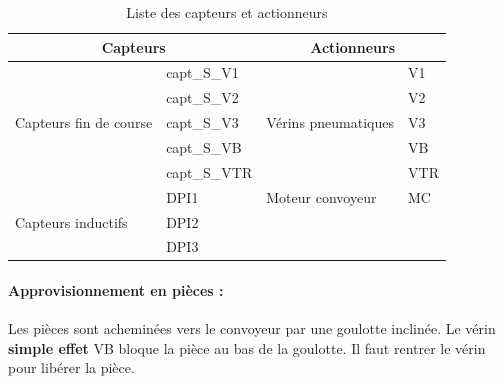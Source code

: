 \documentclass[11pt, multicol]{article}
\begin{document}
\begin{table}[ht]
\centering
	\begin{tabular}{|ll || ll|}
	\hline
		\multicolumn{2}{|c||}{Capteurs}       				& \multicolumn{2}{c|}{Actionneurs}                  \\\hline
		\multirow{5}{*}{Capteurs fin de course}  & capt\_S\_V1    & \multirow{5}{*}{Vérins pneumatiques} & V1 \\
		                                         & capt\_S\_V2    &                                      & V2 \\
		                                         & capt\_S\_V3    &                                      & V3 \\
																						 & capt\_S\_VB		&                                      & VB \\
																						 & capt\_S\_VTR   &                                      & VTR\\\hline
		\multirow{3}{*}{Capteurs inductifs}      & DPI1         & Moteur convoyeur                     & MC \\\cline{3-4}
		                                         & DPI2         &                                      &    \\
		                                         & DPI3         &                                      &    \\\hline
	\end{tabular}
	\caption{Liste des capteurs et actionneurs}
	\label{tab:capteursActionneurs}
\end{table}
\paragraph{Approvisionnement en pièces : } Les pièces sont acheminées vers le convoyeur par une goulotte inclinée. Le vérin \textbf{simple effet}
VB bloque la pièce au bas de la goulotte. Il faut rentrer le vérin pour libérer la pièce.
\end{document}
